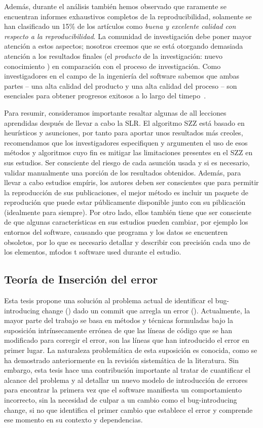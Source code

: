 \documentclass[a4paper, 12pt]{book}
\begin{document}
Adem\'as, durante el an\'alisis tambi\'en hemos observado que raramente se encuentran informes exhaustivos completos de la reproducibilidad, solamente se han clasificado un 15\% de los art\'iculos como \emph{buena y excelente calidad con respecto a la reproducibilidad}. La comunidad de  investigaci\'on debe poner mayor atenci\'on a estos aspectos; nosotros creemos que se est\'a otorgando demasiada atenci\'on a los resultados finales (el \emph{producto} de la investigaci\'on: nuevo conocimiento ) en comparaci\'on con el proceso de investigaci\'on. Como investigadores en el campo de la ingenier\'ia del software sabemos que ambas partes -- una alta calidad del producto y una alta calidad del proceso -- son esenciales para obtener progresos exitosos a lo largo del timepo~\cite{kan2002metrics}.

Para resumir, consideramos importante resaltar algunas de all lecciones aprendidas despu\'es de llevar a cabo la SLR. El algoritmo SZZ est\'a basado en heur\'isticos y asunciones, por tanto para aportar unos resultados m\'as creoles, recomendamos que los investigadores especifiquen y argumenten el uso de esos m\'etodos y algoritmos cuyo fin es mitigar las limitaciones presentes en el SZZ en sus estudios. Ser consciente del riesgo de cada asunci\'on usada y si es necesario, validar manualmente una porci\'on de los resultados obtenidos. Adem\'as, para llevar a cabo estudios emp\'iris, los autores deben ser conscientes que para permitir la reproducci\'on de sus publicaciones, el mejor m\'etodo es incluir un paquete de reproduci\'on que puede estar p\'ublicamente disponible junto con su piblicaci\'on (idealmente para siempre). Por otro lado, ellos tambi\'en tiene que ser consciente de que algunas caracter\'isticas en sus estudios pueden cambiar, por ejemplo los entornos del software, causando que programa y los datos se encuentren obsoletos, por lo que es necesario detallar y describir con precisi\'on cada uno de los elementos, m\'todos t software used durante el estudio.

\subsection{Teor\'ia de Inserci\'on del error}
\label{subsec:teoriaresultado}

Esta tesis propone una soluci\'on al problema actual de identificar el bug-introducing change (\BIC) dado un commit que arregla un error (\BFC). Actualmente, la mayor parte del trabajo se basa en m\'etodos y t\'ecnicas formuladas bajo la suposici\'on intr\'insecamente err\'onea de que las l\'ineas de c\'odigo que se han modificado para corregir el error, son las l\'ineas que han introducido el error en primer lugar. La naturaleza problem\'atica de esta suposici\'on es conocida, como se ha demostrado anteriormente en la revisi\'on sistem\'atica de la literatura. Sin embargo, esta tesis hace una contribuci\'on importante al tratar de cuantificar el alcance del problema y al detallar un nuevo modelo de introducci\'on de errores para encontrar la primera vez que el software manifiesta un comportamiento incorrecto, sin la necesidad de culpar a un cambio como el bug-introducing change, si no que identifica el primer cambio que establece el error y comprende ese momento en su contexto y dependencias.
\end{document}
